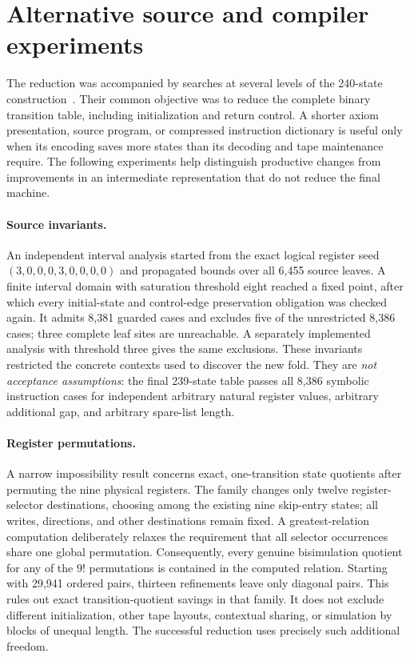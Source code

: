\section{Alternative source and compiler experiments}
\label{sec:source-research}

The reduction was accompanied by searches at several levels of the
240-state construction~\cite{rotation240}.  Their common objective was to
reduce the complete binary transition table, including initialization and
return control.  A shorter axiom presentation, source program, or compressed
instruction dictionary is useful only when its encoding saves more states
than its decoding and tape maintenance require.  The following experiments
help distinguish productive changes from improvements in an intermediate
representation that do not reduce the final machine.

\paragraph{Source invariants.}
An independent interval analysis started from the exact logical register
seed $(3,0,0,0,3,0,0,0,0)$ and propagated bounds over all 6,455 source leaves.
A finite interval domain with saturation threshold eight reached a fixed
point, after which every initial-state and control-edge preservation
obligation was checked again.  It admits 8,381 guarded cases and excludes
five of the unrestricted 8,386 cases; three complete leaf sites are
unreachable.  A separately implemented analysis with threshold three gives
the same exclusions.  These invariants restricted the concrete contexts
used to discover the new fold.  They are \emph{not acceptance assumptions}:
the final 239-state table passes all 8,386 symbolic instruction cases for
independent arbitrary natural register values, arbitrary additional gap,
and arbitrary spare-list length.

\paragraph{Register permutations.}
A narrow impossibility result concerns exact, one-transition state
quotients after permuting the nine physical registers.  The family changes
only twelve register-selector destinations, choosing among the existing
nine skip-entry states; all writes, directions, and other destinations
remain fixed.  A greatest-relation computation deliberately relaxes the
requirement that all selector occurrences share one global permutation.
Consequently, every genuine bisimulation quotient for any of the $9!$
permutations is contained in the computed relation.  Starting with 29,941
ordered pairs, thirteen refinements leave only diagonal pairs.  This rules
out exact transition-quotient savings in that family.  It does not exclude
different initialization, other tape layouts, contextual sharing, or
simulation by blocks of unequal length.  The successful reduction uses
precisely such additional freedom.


